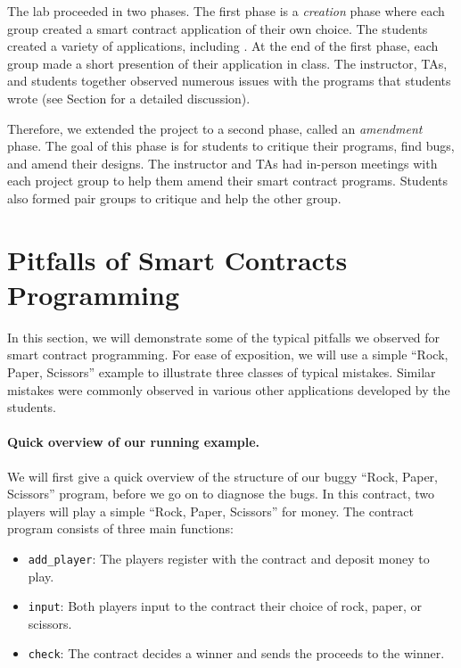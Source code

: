 \documentclass[10pt,twocolumn,letterpaper]{article}
\newcommand{\elaine}[1]{{\color{red}{[elaine: #1]}}}
\begin{document}
The lab proceeded in two phases. 
The first phase is a 
{\it creation} phase where each group created a 
smart contract application
of their own choice.
The students created a variety of applications, including
\elaine{give a laundry list}.
At the end of the first phase, each group 
made a short presention of their 
application in class.
The instructor, TAs, and students together observed numerous issues  
with the programs that students 
wrote (see Section \elaine{refer} for a detailed
discussion). 

Therefore, we extended the project to a second phase, called 
an {\it amendment} phase. 
The goal of this phase is for students to critique their programs,
find bugs, and amend their designs. 
The instructor and TAs had in-person meetings with each project group
to help them amend their smart contract programs.  
Students also formed pair groups to critique and 
help the other group. 



\section{Pitfalls of Smart Contracts Programming}
In this section, we will demonstrate some of the typical pitfalls
we observed for smart contract programming. 
For ease of exposition, we will use
a simple ``Rock, Paper, Scissors''  
example to illustrate three classes of typical mistakes.
Similar mistakes 
were commonly observed in various other 
applications developed by the students.  

\paragraph{Quick overview of our running example.}
We will first give a quick overview of the structure
of our buggy ``Rock, Paper, Scissors'' program, before
we go on to diagnose the bugs.
In this contract, two players 
will play a simple 
``Rock, Paper, Scissors''
for money. 
The contract program consists of three main functions:
\begin{itemize}
\item
{\tt add\_player}:
The players register with the contract
and deposit money to play.
\item
{\tt input}:
Both players input to the contract 
their choice of rock, paper, or scissors.
\item
{\tt check}:
The contract decides a winner
and sends the proceeds to the winner. 
\end{itemize}
\end{document}
